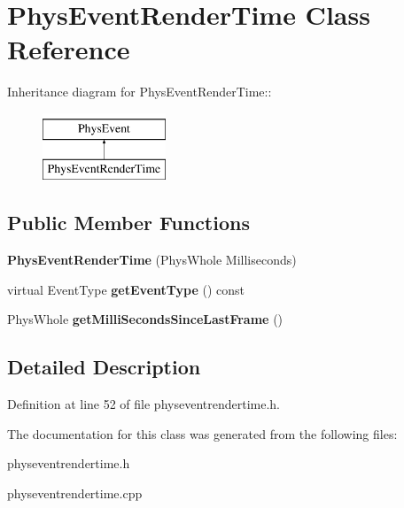 \hypertarget{classPhysEventRenderTime}{
\section{PhysEventRenderTime Class Reference}
\label{d4/d83/classPhysEventRenderTime}
}
Inheritance diagram for PhysEventRenderTime::\begin{figure}[H]
\begin{center}
\leavevmode
\includegraphics[height=2cm]{d4/d83/classPhysEventRenderTime}
\end{center}
\end{figure}
\subsection*{Public Member Functions}
\begin{DoxyCompactItemize}
\item 
\hypertarget{classPhysEventRenderTime_af6ad859225b0c869af9145844ac5a248}{
{\bfseries PhysEventRenderTime} (PhysWhole Milliseconds)}
\label{d4/d83/classPhysEventRenderTime_af6ad859225b0c869af9145844ac5a248}

\item 
\hypertarget{classPhysEventRenderTime_af7e65fb318872368d16d304266a74650}{
virtual EventType {\bfseries getEventType} () const }
\label{d4/d83/classPhysEventRenderTime_af7e65fb318872368d16d304266a74650}

\item 
\hypertarget{classPhysEventRenderTime_aaba6aa77d58877dc8b3784c1ebcfe7b6}{
PhysWhole {\bfseries getMilliSecondsSinceLastFrame} ()}
\label{d4/d83/classPhysEventRenderTime_aaba6aa77d58877dc8b3784c1ebcfe7b6}

\end{DoxyCompactItemize}


\subsection{Detailed Description}


Definition at line 52 of file physeventrendertime.h.

The documentation for this class was generated from the following files:\begin{DoxyCompactItemize}
\item 
physeventrendertime.h\item 
physeventrendertime.cpp\end{DoxyCompactItemize}
